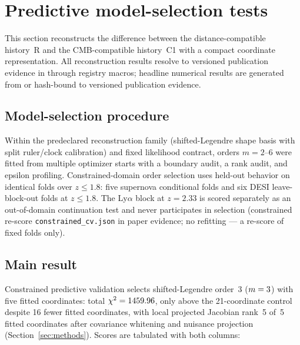 \section{Predictive model-selection tests}
\label{sec:model-selection}

This section reconstructs the difference between the
distance-compatible history~R and the CMB-compatible history~C1 with
a compact coordinate representation. All reconstruction results resolve to
versioned publication evidence in  through
registry macros; headline numerical results are generated from or
hash-bound to versioned publication evidence.

\subsection{Model-selection procedure}

Within the predeclared reconstruction family (shifted-Legendre shape basis
with split ruler/clock calibration) and fixed likelihood contract,
orders $m=2$--$6$ were fitted from multiple optimizer starts with a
boundary audit, a rank audit, and epsilon profiling. Constrained-domain
order selection uses held-out behavior on identical folds over
$z\le1.8$: five supernova conditional folds and six DESI
leave-block-out folds at $z\le1.8$. The Ly$\alpha$ block at $z=2.33$
is scored separately as an out-of-domain continuation test and never
participates in selection
(constrained re-score \texttt{constrained\_cv.json} in paper
evidence;
no refitting — a re-score of fixed folds only).

\subsection{Main result}

Constrained predictive validation selects shifted-Legendre order~3
($m=3{}$) with five fitted coordinates: total
$\chi^{2}=1459.96{}$, only
\BridgeDeltaCtrl{} above the 21-coordinate control despite 16 fewer
fitted coordinates, with local projected Jacobian rank~5 of~5 fitted
coordinates after covariance whitening and nuisance projection
(Section~\ref{sec:methods}). Scores are tabulated with both columns:

\begin{table}[!htbp]
  \centering
  \caption{Constrained-domain held-out scores by order (selection
  column) with the Ly$\alpha$ continuation score alongside. The star
  marks the selected order under the predeclared smallest-$m$-within-2.0
  rule. Fixed folds, re-scored; no refitting.}
  \label{tab:constrained-cv}
  
\end{table}

